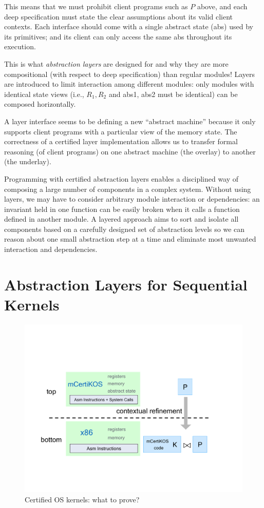 This means that we must prohibit client programs such as $P$ above,
and each deep specification must state the clear assumptions about its
valid client contexts. Each interface should come with a single
abstract state (\textsf{abs}) used by its primitives; and its client can
only access the same \textsf{abs} throughout its execution. 

This is what {\em abstraction layers} are designed for and why they
are more compositional (with respect to deep specification)
than regular modules! Layers are introduced to limit 
interaction among different modules: only modules with identical
state views (i.e., $R_1, R_2$ and \textsf{abs1},
\textsf{abs2} must be identical) can be composed horizontally.
 
A layer interface seems to be defining a new ``abstract machine''
because it only supports client programs with a particular view of the
memory state. The correctness of a certified layer implementation
allows us to transfer formal reasoning (of client programs) on one
abstract machine (the overlay) to another (the underlay).  

Programming with certified abstraction layers enables a disciplined way of
composing a large number of components in a complex system. Without
using layers, we may have to consider arbitrary module interaction or
dependencies: an invariant held in one function can be easily broken
when it calls a function defined in another module. A layered approach
aims to sort and isolate all components based on a carefully designed
set of abstraction levels so we can reason about one small abstraction
step at a time and eliminate most unwanted interaction and dependencies.



\section{Abstraction Layers for Sequential Kernels}

\begin{figure}[tb] \centering
\includegraphics[scale=.5]{figs/mainthm}
\caption{Certified OS kernels: what to prove?}
\hrulefill
\label{fig:mainthm}
\end{figure}


